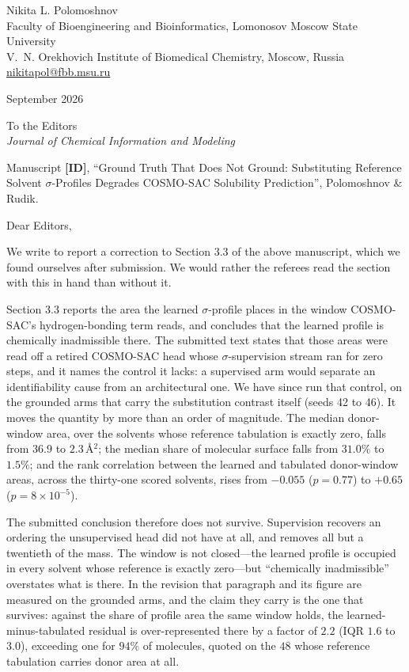 \documentclass[11pt]{article}
\begin{document}
\noindent
{\large Nikita L. Polomoshnov}\\[2pt]
Faculty of Bioengineering and Bioinformatics, Lomonosov Moscow State University\\
V.~N. Orekhovich Institute of Biomedical Chemistry, Moscow, Russia\\
\href{mailto:nikitapol@fbb.msu.ru}{nikitapol@fbb.msu.ru}

\vspace{3mm}
 September 2026

\vspace{3mm}
\noindent
To the Editors\\
\emph{Journal of Chemical Information and Modeling}

\vspace{2mm}
\noindent Manuscript \textbf{[ID]}, ``Ground Truth That Does Not Ground: Substituting Reference
Solvent $\sigma$-Profiles Degrades COSMO-SAC Solubility Prediction'', Polomoshnov \& Rudik.

\vspace{3mm}
\noindent Dear Editors,

We write to report a correction to Section 3.3 of the above manuscript, which we found ourselves
after submission. We would rather the referees read the section with this in hand than without it.

Section 3.3 reports the area the learned $\sigma$-profile places in the window COSMO-SAC's
hydrogen-bonding term reads, and concludes that the learned profile is chemically inadmissible
there. The submitted text states that those areas were read off a retired COSMO-SAC head whose
$\sigma$-supervision stream ran for zero steps, and it names the control it lacks: a supervised arm
would separate an identifiability cause from an architectural one. We have since run that control,
on the grounded arms that carry the substitution contrast itself (seeds 42 to 46). It moves the
quantity by more than an order of magnitude. The median donor-window area, over the solvents whose
reference tabulation is exactly zero, falls from $36.9$ to $2.3$\,\AA$^2$; the median share of
molecular surface falls from $31.0\%$ to $1.5\%$; and the rank correlation between the learned and
tabulated donor-window areas, across the thirty-one scored solvents, rises from $-0.055$ ($p=0.77$)
to $+0.65$ ($p=8\times10^{-5}$).

The submitted conclusion therefore does not survive. Supervision recovers an ordering the
unsupervised head did not have at all, and removes all but a twentieth of the mass. The window is
not closed---the learned profile is occupied in every solvent whose reference is exactly zero---but
``chemically inadmissible'' overstates what is there. In the revision that paragraph and its figure
are measured on the grounded arms, and the claim they carry is the one that survives: against the
share of profile area the same window holds, the learned-minus-tabulated residual is
over-represented there by a factor of $2.2$ (IQR $1.6$ to $3.0$), exceeding one for $94\%$ of
molecules, quoted on the $48$ whose reference tabulation carries donor area at all.
\end{document}
